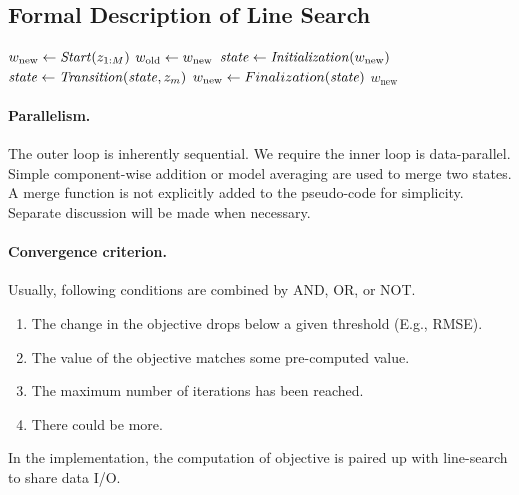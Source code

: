 \subsection{Formal Description of Line Search}
\begin{algorithm} \label{alg:line-search}
\begin{algorithmic}[1]
	\State $w_\text{new} \leftarrow \mathit{Start}(z_{1:M})$
	\Repeat
        \State $w_\text{old} \leftarrow w_\text{new}$
        \State $\mathit{state} \leftarrow \mathit{Initialization}(w_\text{new})$
		 
			\State $\mathit{state} \leftarrow \mathit{Transition}(\mathit{state}, z_m)$
		\EndFor
		\State $w_\text{new} \leftarrow Finalization(\mathit{state})$
    \State \Return $w_\text{new}$
\end{algorithmic}
\end{algorithm}

\paragraph{Parallelism.}
The outer loop is inherently sequential.
We require the inner loop is data-parallel.
Simple component-wise addition or model averaging \cite{DBLP:conf/nips/DuchiAW10} are used to merge two states.
A merge function is not explicitly added to the pseudo-code for simplicity.
Separate discussion will be made when necessary.

\paragraph{Convergence criterion.}
Usually, following conditions are combined by AND, OR, or NOT.
\begin{enumerate}
    \item The change in the objective drops below a given threshold (E.g., RMSE).
    \item The value of the objective matches some pre-computed value.
    \item The maximum number of iterations has been reached.
    \item There could be more.
\end{enumerate}
In the implementation, the computation of objective is paired up with line-search to share data I/O.

